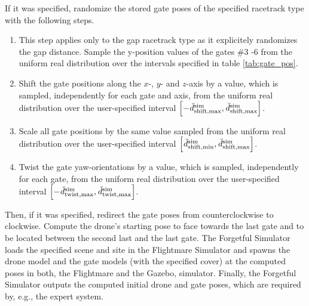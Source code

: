 If it was specified, randomize the stored gate poses of the specified racetrack type
with the following steps.
\begin{enumerate}
    \item This step applies only to the gap racetrack type
    as it explicitely randomizes the gap distance.
    Sample the y-position values 
    of the gates \#3 -6 from the uniform real distribution
    over the intervals specified in table \ref{tab:gate_pos}.
    
    \item Shift the gate positions along the $x$-, $y$- and $z$-axis
    by a value, which is sampled, 
    independently for each gate and axis, 
    from the uniform real distribution
    over the user-specified interval 
    $\left[
        -\dist[\user]{\text{sim}}{\text{shift},\mxm}{}{},
        \dist[\user]{\text{sim}}{\text{shift},\mxm}{}{}\right]$.
    
        \item Scale all gate positions by the same value
    sampled from the uniform real distribution
    over the user-specified interval
    $\left[
        \dist[\user]{\text{sim}}{\text{shift},\mnm}{}{}, 
        \dist[\user]{\text{sim}}{\text{shift},\mxm}{}{}\right]$.
    \item Twist the gate yaw-orientations
    by a value, which is sampled, 
    independently for each gate, 
    from the uniform real distribution
    over the user-specified interval
    $\left[
        -\dist[\user]{\text{sim}}{\text{twist},\mxm}{}{},
        \dist[\user]{\text{sim}}{\text{twist},\mxm}{}{}\right]$.
\end{enumerate}
Then, if it was specified, redirect the gate poses from counterclockwise to clockwise.
Compute the drone's starting pose to face towards the last gate
and to be located between
the second last and the last gate.
The Forgetful Simulator loads the specified scene and site in 
the Flightmare Simulator
and spawns the drone model 
and the gate models (with the specified cover)
at the computed poses
in both, the Flightmare and the Gazebo, simulator.
Finally, the Forgetful Simulator
outputs the computed initial drone and gate poses,
which are required by, e.g., the expert system.




